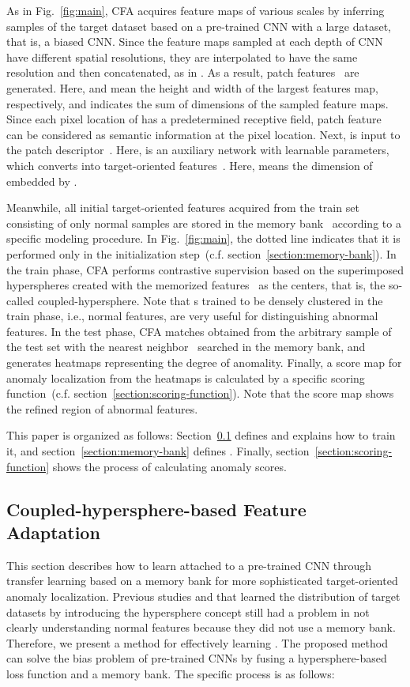 \documentclass[10pt,twocolumn,letterpaper]{article}
\begin{document}
    As in Fig.~\ref{fig:main}, CFA acquires feature maps of various scales by inferring samples of the target dataset based on a pre-trained CNN with a large dataset, that is, a biased CNN. Since the feature maps sampled at each depth of CNN have different spatial resolutions, they are interpolated to have the same resolution and then concatenated, as in \cite{PaDiM}. As a result, patch features~ are generated. Here,  and  mean the height and width of the largest features map, respectively, and  indicates the sum of dimensions of the sampled feature maps. Since each pixel location of  has a predetermined receptive field, patch feature~ can be considered as semantic information at the pixel location.
    Next,  is input to the patch descriptor~. Here,  is an auxiliary network with learnable parameters, which converts  into target-oriented features~. Here,  means the dimension of  embedded by .
    
    Meanwhile, all initial target-oriented features acquired from the train set consisting of only normal samples are stored in the memory bank~ according to a specific modeling procedure. In Fig.~\ref{fig:main}, the dotted line indicates that it is performed only in the initialization step~(c.f. section~\ref{section:memory-bank}). In the train phase, CFA performs contrastive supervision based on the superimposed hyperspheres created with the memorized features~ as the centers, that is, the so-called coupled-hypersphere. Note that s trained to be densely clustered in the train phase, i.e., normal features, are very useful for distinguishing abnormal features. In the test phase, CFA matches  obtained from the arbitrary sample of the test set with the nearest neighbor~ searched in the memory bank, and generates heatmaps representing the degree of anomality. Finally, a score map for anomaly localization from the heatmaps is calculated by a specific scoring function~(c.f. section~\ref{section:scoring-function}). Note that the score map shows the refined region of abnormal features.
    
    This paper is organized as follows: Section~\ref{section:patch-descriptor} defines  and explains how to train it, and section~\ref{section:memory-bank} defines . Finally, section~\ref{section:scoring-function} shows the process of calculating anomaly scores.
    
    \subsection{Coupled-hypersphere-based Feature Adaptation} \label{section:patch-descriptor}
        This section describes how to learn  attached to a pre-trained CNN through transfer learning based on a memory bank for more sophisticated target-oriented anomaly localization. Previous studies \cite{DeepSVDD} and \cite{patchSVDD} that learned the distribution of target datasets by introducing the hypersphere concept still had a problem in not clearly understanding normal features because they did not use a memory bank. Therefore, we present a method for effectively learning . The proposed method can solve the bias problem of pre-trained CNNs by fusing a hypersphere-based loss function and a memory bank. The specific process is as follows:
        
\end{document}
